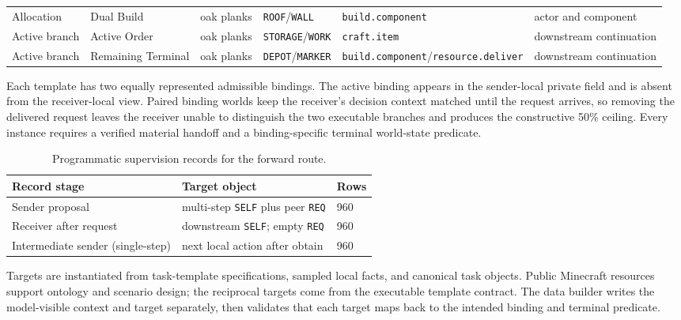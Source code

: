\documentclass[10pt]{article}
\newcommand{\tabstyle}{\small\setlength{\tabcolsep}{2.5pt}\renewcommand{\arraystretch}{1.10}}
\newcommand{\thead}[1]{\textbf{#1}}
\newcommand{\artifact}[1]{\texttt{#1}}
\begin{document}
\begin{table}[!htbp]
\begin{tabularx}{\textwidth}{L{1.65cm} L{2.15cm} L{1.75cm} Z L{2.90cm} L{1.95cm}}
    Allocation & Dual Build & oak planks & \artifact{ROOF}/\artifact{WALL} & \artifact{build.component} & actor and component \\
    Active branch & Active Order & oak planks & \artifact{STORAGE}/\artifact{WORK} & \artifact{craft.item} & downstream continuation \\
    Active branch & Remaining Terminal & oak planks & \artifact{DEPOT}/\newline\artifact{MARKER} & \artifact{build.component}/\newline\artifact{resource.deliver} & downstream continuation \\
    \bottomrule
  \end{tabularx}
\end{table}

Each template has two equally represented admissible bindings. The active binding appears in the sender-local private field and is absent from the receiver-local view. Paired binding worlds keep the receiver's decision context matched until the request arrives, so removing the delivered request leaves the receiver unable to distinguish the two executable branches and produces the constructive 50\% ceiling. Every instance requires a verified material handoff and a binding-specific terminal world-state predicate.

\begin{table}[!htbp]
  \centering
  \caption{Programmatic supervision records for the forward route.}
  \label{tab:supervision}
  \tabstyle
  \begin{tabularx}{\textwidth}{L{2.3cm} Z R{1.0cm}}
    \toprule
    \thead{Record stage} & \thead{Target object} & \thead{Rows} \\
    \midrule
    Sender proposal & multi-step \artifact{SELF} plus peer \artifact{REQ} & 960 \\
    Receiver after request & downstream \artifact{SELF}; empty \artifact{REQ} & 960 \\
    Intermediate sender (single-step) & next local action after obtain & 960 \\
    \bottomrule
  \end{tabularx}
\end{table}

Targets are instantiated from task-template specifications, sampled local facts, and canonical task objects. Public Minecraft resources support ontology and scenario design; the reciprocal targets come from the executable template contract. The data builder writes the model-visible context and target separately, then validates that each target maps back to the intended binding and terminal predicate.
\end{document}
